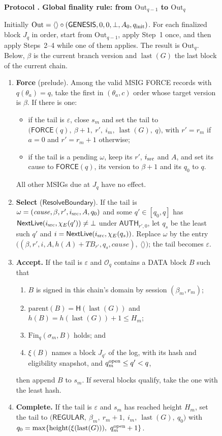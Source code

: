 \documentclass[11pt,a4paper]{article}
\newcommand{\Hash}{\mathsf H}
\newcommand{\TB}{\mathit{TB}}
\newcommand{\tagg}[1]{\ensuremath{\mathsf{#1}}}
\newcounter{protocol}
\newenvironment{protocol}[3][htbp]{\begin{figure}[#1]\refstepcounter{protocol}\label{#2}
\begin{mdframed}[linewidth=.6pt,skipabove=0pt,skipbelow=0pt,
innertopmargin=7pt,innerbottommargin=7pt]\small
\textbf{Protocol \theprotocol. #3}\par\smallskip}{\end{mdframed}\end{figure}}
\begin{document}
\begin{protocol}{alg:global-rule}{Global finality rule: from $\mathrm{Out}_{q-1}$ to $\mathrm{Out}_q$}
Initially $\mathrm{Out}=\langle\rangle\circ(\tagg{GENESIS},0,0,\bot,A_0,q_{\rm init})$.
For each finalized block $J_q$ in order, start from $\mathrm{Out}_{q-1}$,
apply Step~1 once, and then apply Steps~2--4 while one of them applies.
The result is $\mathrm{Out}_q$. Below, $\beta$ is the current branch
version and $\operatorname{last}(G)$ the last block of the current chain.
\begin{enumerate}[label=\textbf{\arabic*)},itemsep=3pt]
\item \textbf{Force} (prelude). Among the valid MSIG FORCE records with
$q(\theta_a)=q$, take the first in $(\theta_a,c)$ order whose target
version is $\beta$. If there is one:
 \begin{itemize}[itemsep=1pt]
 \item if the tail is $\varepsilon$, close $s_m$ and set the tail to
 $\big(\tagg{FORCE}(q),\ \beta+1,\ r',\ i_m,\ \operatorname{last}(G),\ q\big)$,
 with $r'=r_m$ if $a=0$ and $r'=r_m+1$ otherwise;
 \item if the tail is a pending $\omega$, keep its $r'$, $i_{\rm src}$ and
 $A$, and set its cause to $\tagg{FORCE}(q)$, its version to $\beta+1$ and
 its $q_0$ to $q$.
 \end{itemize}
All other MSIGs due at $J_q$ have no effect.
\item \textbf{Select} ($\tagg{ResolveBoundary}$). If the tail is
$\omega=(\mathit{cause},\beta,r',i_{\rm src},A,q_0)$ and some
$q'\in[q_0,q]$ has $\tagg{NextLive}(i_{\rm src},\chi_E(q'))\ne\bot$ under
$\tagg{AUTH}_{r',0}$, let $q_s$ be the least such $q'$ and
$i=\tagg{NextLive}(i_{\rm src},\chi_E(q_s))$. Replace $\omega$ by the
entry $\big((\beta,r',i,A,h(A)+\TB_{r'},q_s,\mathit{cause}),\ \langle\rangle\big)$;
the tail becomes $\varepsilon$.
\item \textbf{Accept.} If the tail is $\varepsilon$ and $\mathcal O_q$
contains a DATA block $B$ such that
 \begin{enumerate}[label=(\alph*),itemsep=1pt]
 \item $B$ is signed in this chain's domain by session $(\beta_m,r_m)$;
 \item $\mathrm{parent}(B)=\Hash(\operatorname{last}(G))$ and
 $h(B)=h(\operatorname{last}(G))+1\le H_m$;
 \item $\mathrm{Fin}_q(\sigma_m,B)$ holds; and
 \item $\xi(B)$ names a block $J_{q'}$ of the log, with its hash and
 eligibility snapshot, and $q^{\rm open}_m\le q'<q$,
 \end{enumerate}
then append $B$ to $s_m$. If several blocks qualify, take the one with
the least hash.
\item \textbf{Complete.} If the tail is $\varepsilon$ and $s_m$ has
reached height $H_m$, set the tail to
$\big(\tagg{REGULAR},\ \beta_m,\ r_m+1,\ i_m,\ \operatorname{last}(G),\ q_0\big)$
with $q_0=\max\{\operatorname{height}(\xi(\operatorname{last}(G))),\ q^{\rm open}_m+1\}$.
\end{enumerate}
\end{protocol}
\end{document}
